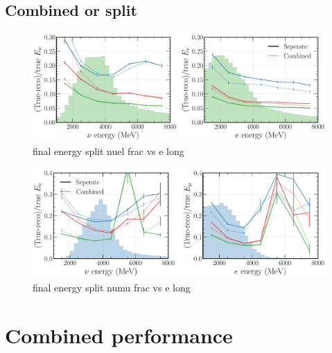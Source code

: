 \subsection{Combined or split} %
\label{sec:cvn_energy_split} %

\begin{figure} %
    \includegraphics[width=\textwidth]{diagrams/7-cvn/chipsnet/final_energy_split_nuel_frac_vs_e.pdf}
    \caption[final energy split nuel frac vs e short]
    {final energy split nuel frac vs e long}
    \label{fig:final_energy_split_nuel_frac_vs_e}
\end{figure}

\begin{figure} %
    \includegraphics[width=\textwidth]{diagrams/7-cvn/chipsnet/final_energy_split_numu_frac_vs_e.pdf}
    \caption[final energy split numu frac vs e short]
    {final energy split numu frac vs e long}
    \label{fig:final_energy_split_numu_frac_vs_e}
\end{figure}

\section{Combined performance} %
\label{sec:cvn_final} %

